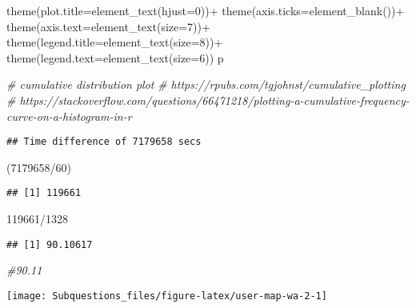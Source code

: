 \documentclass[
]{article}
\newenvironment{Shaded}{\begin{snugshade}}{\end{snugshade}}
\newcommand{\AttributeTok}[1]{\textcolor[rgb]{0.77,0.63,0.00}{#1}}
\newcommand{\CommentTok}[1]{\textcolor[rgb]{0.56,0.35,0.01}{\textit{#1}}}
\newcommand{\DecValTok}[1]{\textcolor[rgb]{0.00,0.00,0.81}{#1}}
\newcommand{\FunctionTok}[1]{\textcolor[rgb]{0.00,0.00,0.00}{#1}}
\newcommand{\NormalTok}[1]{#1}
\newcommand{\SpecialCharTok}[1]{\textcolor[rgb]{0.00,0.00,0.00}{#1}}
\begin{document}
\begin{Shaded}
\begin{Highlighting}[]
  \FunctionTok{theme}\NormalTok{(}\AttributeTok{plot.title=}\FunctionTok{element\_text}\NormalTok{(}\AttributeTok{hjust=}\DecValTok{0}\NormalTok{))}\SpecialCharTok{+}
  \FunctionTok{theme}\NormalTok{(}\AttributeTok{axis.ticks=}\FunctionTok{element\_blank}\NormalTok{())}\SpecialCharTok{+}
  \FunctionTok{theme}\NormalTok{(}\AttributeTok{axis.text=}\FunctionTok{element\_text}\NormalTok{(}\AttributeTok{size=}\DecValTok{7}\NormalTok{))}\SpecialCharTok{+}
  \FunctionTok{theme}\NormalTok{(}\AttributeTok{legend.title=}\FunctionTok{element\_text}\NormalTok{(}\AttributeTok{size=}\DecValTok{8}\NormalTok{))}\SpecialCharTok{+}
  \FunctionTok{theme}\NormalTok{(}\AttributeTok{legend.text=}\FunctionTok{element\_text}\NormalTok{(}\AttributeTok{size=}\DecValTok{6}\NormalTok{))}
\NormalTok{p}
\end{Highlighting}
\end{Shaded}

\begin{Shaded}
\begin{Highlighting}[]
\CommentTok{\# cumulative distribution plot}
\CommentTok{\# https://rpubs.com/tgjohnst/cumulative\_plotting}
\CommentTok{\# https://stackoverflow.com/questions/66471218/plotting{-}a{-}cumulative{-}frequency{-}curve{-}on{-}a{-}histogram{-}in{-}r}
\end{Highlighting}
\end{Shaded}

\begin{Shaded}
\end{Shaded}

\begin{verbatim}
## Time difference of 7179658 secs
\end{verbatim}

\begin{Shaded}
\begin{Highlighting}[]
\NormalTok{(}\DecValTok{7179658}\SpecialCharTok{/}\DecValTok{60}\NormalTok{)}
\end{Highlighting}
\end{Shaded}

\begin{verbatim}
## [1] 119661
\end{verbatim}

\begin{Shaded}
\begin{Highlighting}[]
\DecValTok{119661}\SpecialCharTok{/}\DecValTok{1328}
\end{Highlighting}
\end{Shaded}

\begin{verbatim}
## [1] 90.10617
\end{verbatim}

\begin{Shaded}
\begin{Highlighting}[]
\CommentTok{\#90.11}
\end{Highlighting}
\end{Shaded}

\texttt{[image: Subquestions\_files/figure-latex/user-map-wa-2-1]}
\end{document}
